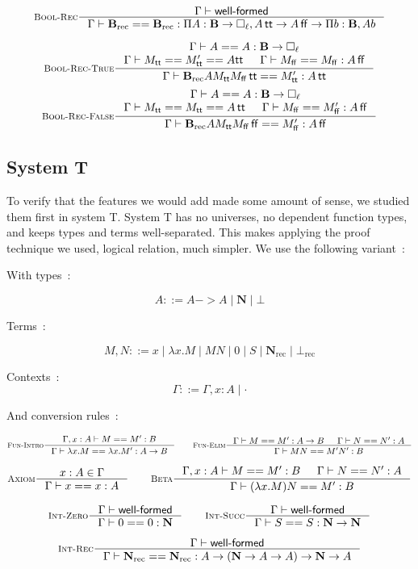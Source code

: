 \documentclass[11pt]{article}
\DeclareMathOperator{\rec}{rec}
\DeclareMathOperator{\true}{\mathsf{tt}}
\DeclareMathOperator{\false}{\mathsf{ff}}
\newcommand{\0}{\mathbf{0}}
\newcommand{\1}{\mathbf{1}}
\newcommand{\nat}{\mathbf{N}}
\newcommand{\bool}{\mathbf{B}}
\newcommand{\tctx}{\Gamma}
\newcommand{\Wf}{\textsf{well-formed}}
\begin{document}
$$
    \inference[\textsc{Bool-Rec}]{\tctx |- \Wf}{\tctx |- \bool_{\rec} == \bool_{\rec} : \Pi A : \bool \to \square_\ell, A \true \to A\false \to \Pi b :\bool, A b}
$$


$$
    \inference[\textsc{Bool-Rec-True}]{\tctx |- A == A : \bool -> \square_\ell \\ \tctx |- M_{\true} == M'_{\true} == A {\true} & \tctx |- M_{\false} == M_{\false} : A \false}{\tctx |- \bool_{\rec} A M_{\true} M_{\false} \true == M'_{\true} : A \true}
$$
$$
    \inference[\textsc{Bool-Rec-False}]{\tctx |- A == A : \bool -> \square_\ell \\ \tctx |- M_{\true} == M_{\true} == A \true & \tctx |- M_{\false} == M'_{\false} : A \false}{\tctx |- \bool_{\rec} A M_{\true} M_{\false} \false == M'_{\false} : A \false}
$$

\subsection{System T}
To verify that the features we would add made some amount of sense, we studied them first in system T.
System T has no universes, no dependent function types, and keeps types and terms well-separated.
This makes applying the proof technique we used, logical relation, much simpler.
We use the following variant~:

With types~:

$$ A ::= A -> A \mid \nat \mid \bot $$

Terms~:

$$ M,N ::= x \mid \lambda x. M \mid MN \mid 0 \mid S \mid \nat_{\rec} \mid \bot_{\rec} $$


Contexts~:
$$ \tctx ::= \tctx, x : A \mid \cdot $$

And conversion rules~:


$$
    \inference[\textsc{Fun-Intro}]{\tctx, x : A |- M == M' : B }{\tctx |- \lambda x. M == \lambda x. M' : A -> B} \qquad
    \inference[\textsc{Fun-Elim}]{\tctx |- M == M' : A -> B& \tctx |- N == N' : A}{\tctx |- MN == M'N' : B}
$$

$$
    \inference[\textsc{Axiom}]{x : A \in \tctx }{\tctx |- x == x : A} \qquad
    \inference[\textsc{Beta}]{\tctx, x : A |- M == M' : B & \tctx |- N == N' : A}{\tctx |- (\lambda x. M)N == M' : B}
$$

$$
    \inference[\textsc{Int-Zero}]{\tctx |- \Wf}{\tctx |- 0 == 0 : \nat} \qquad
    \inference[\textsc{Int-Succ}]{\tctx |- \Wf}{\tctx |- S == S : \nat -> \nat}
$$

$$
    \inference[\textsc{Int-Rec}]{\tctx |- \Wf}{\tctx |- \nat_{\rec} == \nat_{\rec} : A \to \left(\nat -> A -> A \right) -> \nat -> A}
$$
\end{document}
